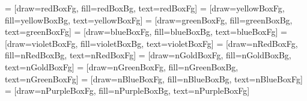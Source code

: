 

 = [draw=redBoxFg, fill=redBoxBg, text=redBoxFg]
 = [draw=yellowBoxFg, fill=yellowBoxBg, text=yellowBoxFg]
 = [draw=greenBoxFg, fill=greenBoxBg, text=greenBoxFg]
 = [draw=blueBoxFg, fill=blueBoxBg, text=blueBoxFg]
 = [draw=violetBoxFg, fill=violetBoxBg, text=violetBoxFg]
 = [draw=nRedBoxFg, fill=nRedBoxBg, text=nRedBoxFg]
 = [draw=nGoldBoxFg, fill=nGoldBoxBg, text=nGoldBoxFg]
 = [draw=nGreenBoxFg, fill=nGreenBoxBg, text=nGreenBoxFg]
 = [draw=nBlueBoxFg, fill=nBlueBoxBg, text=nBlueBoxFg]
 = [draw=nPurpleBoxFg, fill=nPurpleBoxBg, text=nPurpleBoxFg]












